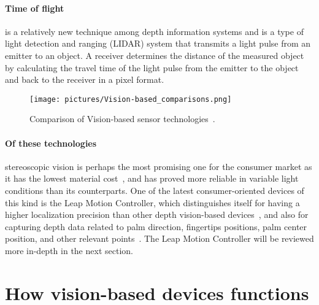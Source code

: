 \paragraph{Time of flight}is a relatively new technique among depth information systems
and is a type of light detection and ranging (LIDAR) system that transmits a light pulse from an emitter to an object. A receiver determines the distance of the measured object by calculating the travel time of the light pulse from the emitter to the object and back to the receiver in a pixel format.

\begin{figure}%
	\texttt{[image: pictures/Vision-based\_comparisons.png]}
	\caption{Comparison of Vision-based sensor technologies~\citep{Ko2012}.}
	\label{fig:VBComparisions}
\end{figure} 

\paragraph{Of these technologies} stereoscopic vision is perhaps the most promising one for the consumer market as it has the lowest material cost~\citep{Ko2012}, and has proved more reliable in variable light conditions than its counterparts. One of the latest consumer-oriented devices of this kind is the Leap Motion Controller, which distinguishes itself for having a higher localization precision than other depth vision-based devices~\citep{Weichert2013}, and also for capturing depth data related to palm direction, fingertips positions, palm center position, and other relevant points~\citep{Wei2016}. The Leap Motion Controller will be reviewed more in-depth in the next section. 

\section{How vision-based devices functions}